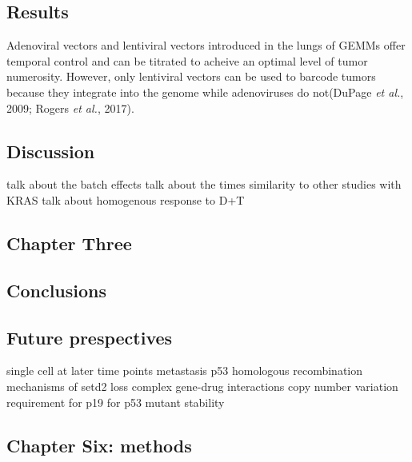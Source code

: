 \hypertarget{results-2}{%
\subsection{Results}\label{results-2}}

Adenoviral vectors and lentiviral vectors introduced in the lungs of GEMMs offer temporal control and can be titrated to acheive an optimal level of tumor numerosity. However, only lentiviral vectors can be used to barcode tumors because they integrate into the genome while adenoviruses do not(DuPage \emph{et al.}, 2009; Rogers \emph{et al.}, 2017).

\hypertarget{discussion-2}{%
\subsection{Discussion}\label{discussion-2}}

talk about the batch effects
talk about the times
similarity to other studies with KRAS
talk about homogenous response to D+T

\hypertarget{chapter-three-1}{%
\subsection{Chapter Three}\label{chapter-three-1}}

\hypertarget{conclusions}{%
\subsection{Conclusions}\label{conclusions}}

\hypertarget{future-prespectives}{%
\subsection{Future prespectives}\label{future-prespectives}}

single cell at later time points
metastasis
p53 homologous recombination
mechanisms of setd2 loss
complex gene-drug interactions
copy number variation
requirement for p19 for p53 mutant stability

\hypertarget{chapter-six-methods}{%
\subsection{Chapter Six: methods}\label{chapter-six-methods}}

